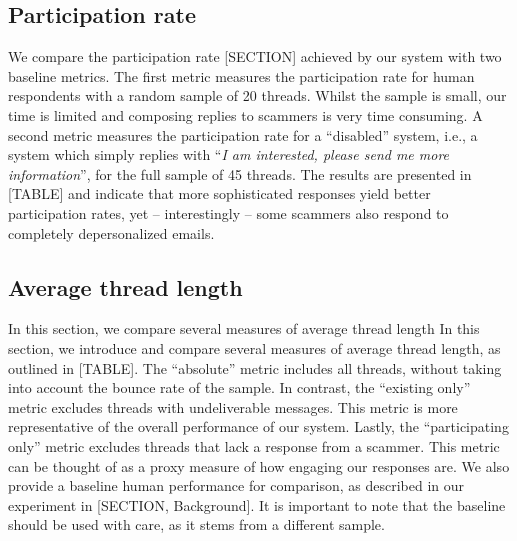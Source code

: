 \begin{center}
\end{center}

\subsection{Participation rate}
We compare the participation rate [SECTION] achieved by our system with two baseline metrics. The first metric measures the participation rate for human respondents with a random sample of 20 threads. Whilst the sample is small, our time is limited and composing replies to scammers is very time consuming. A second metric measures the participation rate for a ``disabled'' system, i.e., a system which simply replies with ``\textit{I am interested, please send me more information}'', for the full sample of 45 threads.  The results are presented in [TABLE] and indicate that more sophisticated responses yield better participation rates, yet -- interestingly -- some scammers also respond to completely depersonalized emails.

\begin{center}
\end{center}
 
\subsection{Average thread length}
In this section, we compare several measures of average thread length 
In this section, we introduce and compare several measures of average thread length, as outlined in [TABLE].  The ``absolute'' metric includes all threads, without taking into account the bounce rate of the sample. In contrast, the ``existing only'' metric excludes threads with undeliverable messages. This metric is more representative of the overall performance of our system. Lastly, the ``participating only'' metric excludes threads that lack a response from a scammer. This metric can be thought of as a proxy measure of how engaging our responses are. We also provide a baseline human performance for comparison, as described in our experiment in [SECTION, Background]. It is important to note that the baseline should be used with care, as it stems from a different sample.

